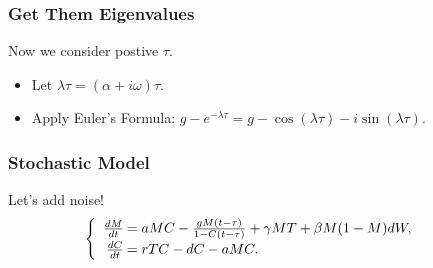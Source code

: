 \documentclass{beamer}
\begin{document}
\begin{frame}\frametitle{Get Them Eigenvalues}
Now we consider postive $\tau$.
\begin{itemize}
\item Let $\lambda \tau=(\alpha+i\omega)\tau$.
\item Apply Euler's Formula: $g-e^{-\lambda\tau}=g-\cos(\lambda\tau)-i\sin(\lambda\tau)$.
\end{itemize}
\end{frame}

\begin{frame}
\frametitle{Stochastic Model}
Let's add noise!
$$\begin{cases}
\begin{array}{rl}
\frac{dM}{dt}\hspace{-.8em}&=aMC - \frac{gM(t-\tau)}{1-C(t-\tau)}+\gamma M T+\beta M(1-M)dW,\\
\frac{dC}{dt}\hspace{-.8em}&=rTC - dC - aMC.\\
\end{array}
\end{cases}$$
\end{frame}

\end{document}
